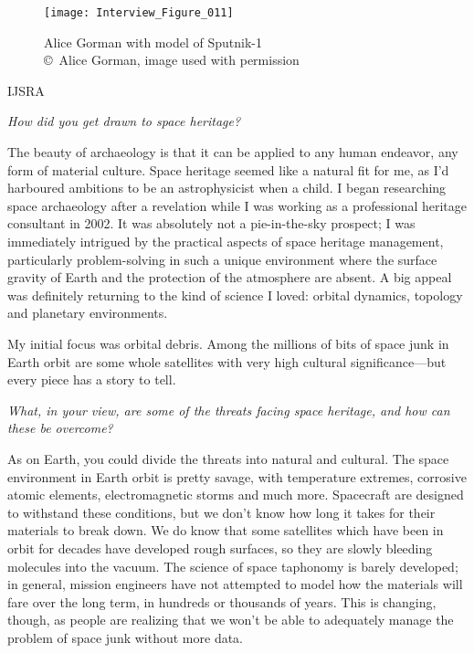 \begin{figure}[!htb]
	\texttt{[image: Interview\_Figure\_011]}
	\centering
	\caption{Alice Gorman with model of Sputnik-1
		{\normalfont\scriptsize \\ \copyright\ Alice Gorman, image used with permission
	}}
	\label{Interview_Figure_011}
\end{figure}

\begin{labeling}{IJSRA}
	\item[IJSRA (International Journal of Student Research in Archaeology)] \emph{How did you get drawn to space heritage?}

	\item[Alice Gorman (AG)] The beauty of archaeology is that it can be applied to any human endeavor, any form of material culture. Space heritage seemed like a natural fit for me, as I’d harboured ambitions to be an astrophysicist when a child. I began researching space archaeology after a revelation while I was working as a professional heritage consultant in 2002. It was absolutely not a pie-in-the-sky prospect; I was immediately intrigued by the practical aspects of space heritage management, particularly problem-solving in such a unique environment where the surface gravity of Earth and the protection of the atmosphere are absent. A big appeal was definitely returning to the kind of science I loved: orbital dynamics, topology and planetary environments.

	My initial focus was orbital debris. Among the millions of bits of space junk in Earth orbit are some whole satellites with very high cultural significance—but every piece has a story to tell.

	\item[IJSRA] \emph{What, in your view, are some of the threats facing space heritage, and how can these be overcome?}

	\item[AG] As on Earth, you could divide the threats into natural and cultural. The space environment in Earth orbit is pretty savage, with temperature extremes, corrosive atomic elements, electromagnetic storms and much more. Spacecraft are designed to withstand these conditions, but we don’t know how long it takes for their materials to break down. We do know that some satellites which have been in orbit for decades have developed rough surfaces, so they are slowly bleeding molecules into the vacuum. The science of space taphonomy is barely developed; in general, mission engineers have not attempted to model how the materials will fare over the long term, in hundreds or thousands of years. This is changing, though, as people are realizing that we won’t be able to adequately manage the problem of space junk without more data.


\end{labeling}
